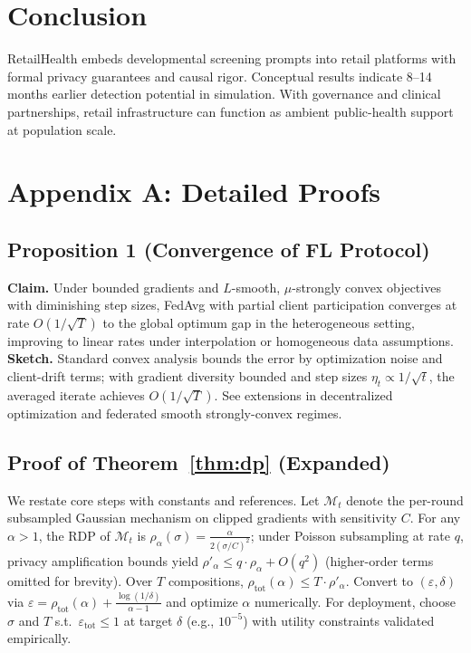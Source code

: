 \documentclass[conference]{IEEEtran}
\newcommand{\eps}{\varepsilon}
\theoremstyle{plain}
\theoremstyle{remark}
\begin{document}
\section{Conclusion}\label{sec:conclusion}
RetailHealth embeds developmental screening prompts into retail platforms with formal privacy guarantees and causal rigor. Conceptual results indicate 8--14 months earlier detection potential in simulation. With governance and clinical partnerships, retail infrastructure can function as ambient public-health support at population scale.

\section*{Appendix A: Detailed Proofs}
\subsection*{Proposition 1 (Convergence of FL Protocol)}
\textbf{Claim.} Under bounded gradients and $L$-smooth, $\mu$-strongly convex objectives with diminishing step sizes, FedAvg with partial client participation converges at rate $O(1/\sqrt{T})$ to the global optimum gap in the heterogeneous setting, improving to linear rates under interpolation or homogeneous data assumptions. \textbf{Sketch.} Standard convex analysis bounds the error by optimization noise and client-drift terms; with gradient diversity bounded and step sizes $\eta_t\propto 1/\sqrt{t}$, the averaged iterate achieves $O(1/\sqrt{T})$. See extensions in decentralized optimization and federated smooth strongly-convex regimes.
\label{appendix:proofs}
\subsection*{Proof of Theorem~\ref{thm:dp} (Expanded)}
We restate core steps with constants and references. Let $\mathcal{M}_t$ denote the per-round subsampled Gaussian mechanism on clipped gradients with sensitivity $C$. For any $\alpha>1$, the RDP of $\mathcal{M}_t$ is $\rho_\alpha(\sigma)=\frac{\alpha}{2(\sigma/C)^2}$; under Poisson subsampling at rate $q$, privacy amplification bounds yield $\rho'_\alpha \le q \cdot \rho_\alpha + O(q^2)$ (higher-order terms omitted for brevity). Over $T$ compositions, $\rho_{\mathrm{tot}}(\alpha) \le T \cdot \rho'_\alpha$. Convert to $(\eps,\delta)$ via $\eps=\rho_{\mathrm{tot}}(\alpha)+\frac{\log(1/\delta)}{\alpha-1}$ and optimize $\alpha$ numerically. For deployment, choose $\sigma$ and $T$ s.t.\ $\eps_{\mathrm{tot}}\le 1$ at target $\delta$ (e.g., $10^{-5}$) with utility constraints validated empirically.
\end{document}
